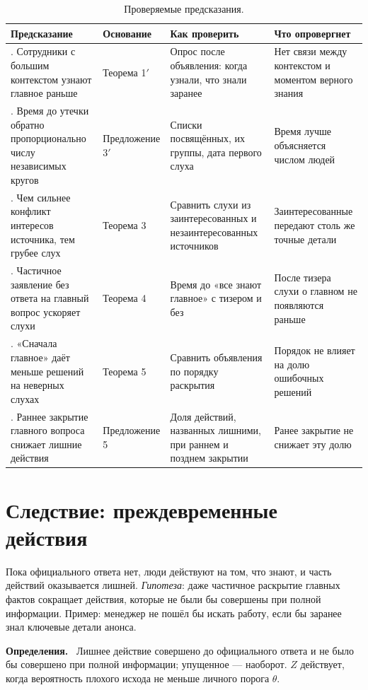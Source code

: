 \documentclass[10pt,a4paper,twocolumn]{article}
\theoremstyle{plain}
\newenvironment{dfn}[1]{\par\smallskip\noindent\textbf{#1.}\ }{\par\smallskip}
\begin{document}
\begin{table}[t]
\centering\small
\caption{Проверяемые предсказания.}
\label{tab:pred}
\begin{tabularx}{\textwidth}{@{}>{\raggedright\arraybackslash}p{}>{\raggedright\arraybackslash}p{}>{\raggedright\arraybackslash}X>{\raggedright\arraybackslash}X@{}}
\toprule
Предсказание & Основание & Как проверить & Что опровергнет \\
\midrule
1. Сотрудники с большим контекстом узнают главное раньше & Теорема 1$'$ & Опрос после объявления: когда узнали, что знали заранее & Нет связи между контекстом и моментом верного знания \\
2. Время до утечки обратно пропорционально числу независимых кругов & Предложение 3$'$ & Списки посвящённых, их группы, дата первого слуха & Время лучше объясняется числом людей \\
3. Чем сильнее конфликт интересов источника, тем грубее слух & Теорема 3 & Сравнить слухи из заинтересованных и незаинтересованных источников & Заинтересованные передают столь же точные детали \\
4. Частичное заявление без ответа на главный вопрос ускоряет слухи & Теорема 4 & Время до «все знают главное» с тизером и без & После тизера слухи о главном не появляются раньше \\
5. «Сначала главное» даёт меньше решений на неверных слухах & Теорема 5 & Сравнить объявления по порядку раскрытия & Порядок не влияет на долю ошибочных решений \\
6. Раннее закрытие главного вопроса снижает лишние действия & Предложение 5 & Доля действий, названных лишними, при раннем и позднем закрытии & Ранее закрытие не снижает эту долю \\
\bottomrule
\end{tabularx}
\end{table}

\section{Следствие: преждевременные действия}

Пока официального ответа нет, люди действуют на том, что знают, и часть действий оказывается лишней. \emph{Гипотеза}: даже частичное раскрытие главных фактов сокращает действия, которые не были бы совершены при полной информации. Пример: менеджер не пошёл бы искать работу, если бы заранее знал ключевые детали анонса.

\begin{dfn}{Определения}
Лишнее действие совершено до официального ответа и не было бы совершено при полной информации; упущенное — наоборот. $Z$ действует, когда вероятность плохого исхода не меньше личного порога $\theta$.
\end{dfn}
\end{document}
